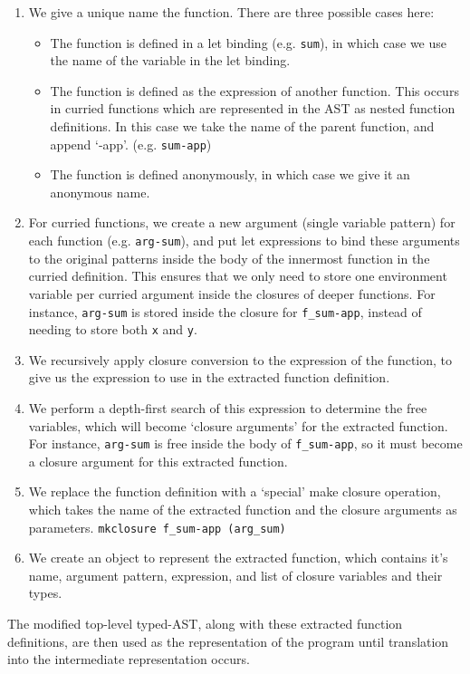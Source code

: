 \documentclass[12pt,twoside,notitlepage]{report}
\newcommand{\camlinline}{\texttt}
\begin{document}
\begin{enumerate}
	\item We give a unique name the function. There are three possible cases here:
	\begin{itemize}
		\item The function is defined in a let binding (e.g. \camlinline{sum}), in which case we use the name of the variable in the let binding.
		\item The function is defined as the expression of another function. This occurs in curried functions which are represented in the AST as nested function definitions. In this case we take the name of the parent function, and append `-app'. (e.g. \camlinline{sum-app})
		\item The function is defined anonymously, in which case we give it an anonymous name.
	\end{itemize}
	\item For curried functions, we create a new argument (single variable pattern) for each function (e.g. \camlinline{arg-sum}), and put let expressions to bind these arguments to the original patterns inside the body of the innermost function in the curried definition. This ensures that we only need to store one environment variable per curried argument inside the closures of deeper functions. For instance, \camlinline{arg-sum} is stored inside the closure for \camlinline{$$f_sum-app}, instead of needing to store both \camlinline{x} and \camlinline{y}.
	
	\item We recursively apply closure conversion to the expression of the function, to give us the expression to use in the extracted function definition.
	\item We perform a depth-first search of this expression to determine the free variables, which will become `closure arguments' for the extracted function. For instance, \camlinline{arg-sum} is free inside the body of \camlinline{$$f_sum-app}, so it must become a closure argument for this extracted function.
	\item We replace the function definition with a `special' make closure operation, which takes the name of the extracted function and the closure arguments as parameters. \camlinline{mkclosure $$f_sum-app (arg_sum)}
	\item We create an object to represent the extracted function, which contains it's name, argument pattern, expression, and list of closure variables and their types.
\end{enumerate}
The modified top-level typed-AST, along with these extracted function definitions, are then used as the representation of the program until translation into the intermediate representation occurs.
\end{document}
